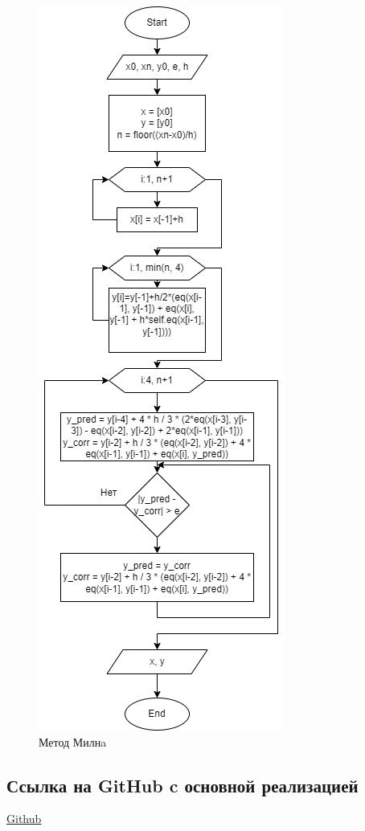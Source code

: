 \documentclass{article}
\begin{document}
    		\begin{figure}[H]
    		\centering
    		\includegraphics[scale=0.7]{milne.png}
    		\caption[Схема-1]{Метод Милнa}
    		\label{fig:screenshot003}
    	\end{figure}               
      \subsection{Ссылка на GitHub c основной реализацией}
            \href{https://github.com/isofinly/compmath}{Github}
\end{document}
